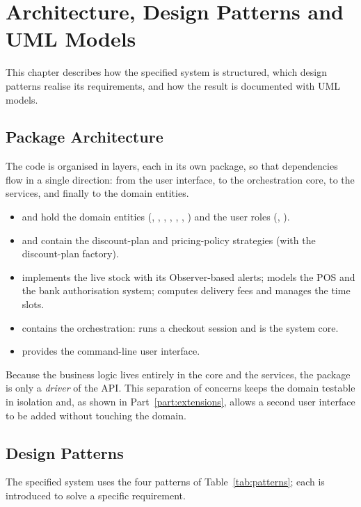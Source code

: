 \chapter{Architecture, Design Patterns and UML Models}
\label{ch:architecture}

This chapter describes how the specified system is structured, which design
patterns realise its requirements, and how the result is documented with UML
models.

\section{Package Architecture}
The code is organised in layers, each in its own package, so that dependencies
flow in a single direction: from the user interface, to the orchestration core,
to the services, and finally to the domain entities.

\begin{itemize}[nosep]
  \item {} and  hold the domain entities (,
  , , , ,
  , ) and the user roles (,
  ).
  \item {} and  contain the discount-plan and
  pricing-policy strategies (with the discount-plan factory).
  \item {} implements the live stock with its Observer-based
  alerts;  models the POS and the bank authorisation system;
   computes delivery fees and manages the time slots.
  \item {} contains the orchestration:  runs a
  checkout session and  is the system core.
  \item {} provides the command-line user interface.
\end{itemize}

Because the business logic lives entirely in the core and the services, the
 package is only a \emph{driver} of the  API. This
separation of concerns keeps the domain testable in isolation and, as shown in
Part~\ref{part:extensions}, allows a second user interface to be added without
touching the domain.

\section{Design Patterns}
The specified system uses the four patterns of Table~\ref{tab:patterns}; each is
introduced to solve a specific requirement.

